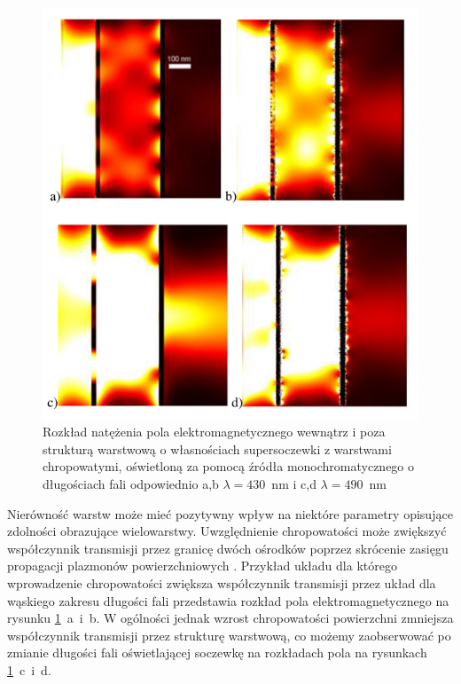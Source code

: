 \begin{figure}[!hbt]
	\begin{center}
	\includegraphics[width=.9\textwidth]{images/multilayer/plp-chropo.png}
	\end{center}
	\caption{Rozkład natężenia pola elektromagnetycznego wewnątrz i poza strukturą warstwową o własnościach supersoczewki z warstwami chropowatymi, oświetloną za pomocą źródła monochromatycznego o długościach fali odpowiednio a,b $\lambda=430$~nm  i  c,d $\lambda=490$~nm~\cite{Stolarek_2013}}
	\label{fig:plp-chropo-fdtd}
\end{figure}


Nierówność warstw może mieć pozytywny wpływ na niektóre parametry opisujące zdolności obrazujące wielowarstwy. Uwzględnienie chropowatości może zwiększyć współczynnik transmisji przez granicę dwóch ośrodków poprzez skrócenie zasięgu propagacji plazmonów powierzchniowych \cite{huang2012subwavelength}. Przykład układu dla którego wprowadzenie chropowatości zwiększa współczynnik transmisji przez układ dla wąskiego zakresu długości fali przedstawia rozkład pola elektromagnetycznego na rysunku \ref{fig:plp-chropo-fdtd}~a~i~b. W ogólności jednak wzrost chropowatości powierzchni zmniejsza współczynnik transmisji przez strukturę warstwową, co możemy zaobserwować po zmianie długości fali oświetlającej soczewkę na rozkładach pola na rysunkach \ref{fig:plp-chropo-fdtd}~c~i~d. 

